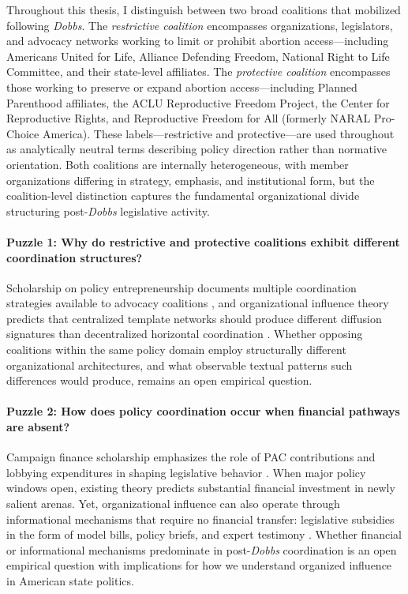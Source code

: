 Throughout this thesis, I distinguish between two broad coalitions that mobilized following \emph{Dobbs}. The \emph{restrictive coalition} encompasses organizations, legislators, and advocacy networks working to limit or prohibit abortion access---including Americans United for Life, Alliance Defending Freedom, National Right to Life Committee, and their state-level affiliates. The \emph{protective coalition} encompasses those working to preserve or expand abortion access---including Planned Parenthood affiliates, the ACLU Reproductive Freedom Project, the Center for Reproductive Rights, and Reproductive Freedom for All (formerly NARAL Pro-Choice America). These labels---restrictive and protective---are used throughout as analytically neutral terms describing policy direction rather than normative orientation. Both coalitions are internally heterogeneous, with member organizations differing in strategy, emphasis, and institutional form, but the coalition-level distinction captures the fundamental organizational divide structuring post-\emph{Dobbs} legislative activity.

\paragraph{Puzzle 1: Why do restrictive and protective coalitions exhibit different coordination structures?}

Scholarship on policy entrepreneurship documents multiple coordination strategies available to advocacy coalitions \parencite{mintromPolicyEntrepreneurshipPolicy2009}, and organizational influence theory predicts that centralized template networks should produce different diffusion signatures than decentralized horizontal coordination \parencite{garrettInterestGroupInfluence2015,hertel-fernandezStateCapture2019}. Whether opposing coalitions within the same policy domain employ structurally different organizational architectures, and what observable textual patterns such differences would produce, remains an open empirical question.

\paragraph{Puzzle 2: How does policy coordination occur when financial pathways are absent?}

Campaign finance scholarship emphasizes the role of PAC contributions and lobbying expenditures in shaping legislative behavior \parencite{hallBuyingTimeMoneyed,baumgartner_jones_1993}. When major policy windows open, existing theory predicts substantial financial investment in newly salient arenas. Yet, organizational influence can also operate through informational mechanisms that require no financial transfer: legislative subsidies in the form of model bills, policy briefs, and expert testimony \parencite{hallLobbyingLegislativeSubsidy2006a}. Whether financial or informational mechanisms predominate in post-\emph{Dobbs} coordination is an open empirical question with implications for how we understand organized influence in American state politics.


